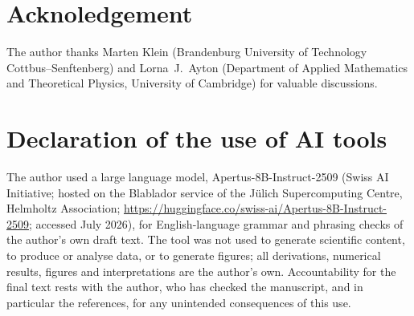 \documentclass[lineno]{JFM-FLM_Au}
\begin{document}
\section{Acknoledgement}
The author thanks Marten Klein (Brandenburg
University of Technology Cottbus--Senftenberg) and Lorna~J.~Ayton (Department of
Applied Mathematics and Theoretical Physics, University of Cambridge) for
valuable discussions.

\section{Declaration of the use of AI tools}The author used a large
language model, Apertus-8B-Instruct-2509 \citep{swissai2025apertus} (Swiss AI
Initiative; hosted on the Blablador service of the J\"ulich Supercomputing
Centre, Helmholtz Association; \url{https://huggingface.co/swiss-ai/Apertus-8B-Instruct-2509};
accessed July 2026), for English-language grammar and phrasing checks of the
author's own draft text. The tool was not used to generate scientific content,
to produce or analyse data, or to generate figures; all derivations, numerical
results, figures and interpretations are the author's own. Accountability for
the final text rests with the author, who has checked the manuscript, and in
particular the references, for any unintended consequences of this use.



\end{document}
